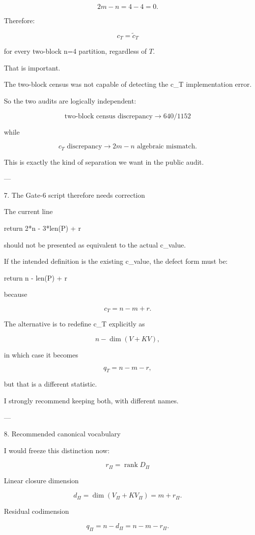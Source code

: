 \[
2m-n=4-4=0.
\]

Therefore:

\[
c_T=\widetilde c_T
\]

for every two-block n=4 partition, regardless of \(T\).

That is important.

The two-block census was not capable of detecting the c_T implementation error.

So the two audits are logically independent:

\[
\boxed{
\text{two-block census discrepancy}
\rightarrow
640/1152
}
\]

while

\[
\boxed{
c_T\text{ discrepancy}
\rightarrow
2m-n\text{ algebraic mismatch}.
}
\]

This is exactly the kind of separation we want in the public audit.


---

7. The Gate-6 script therefore needs correction

The current line

return 2*n - 3*len(P) + r

should not be presented as equivalent to the actual c_value.

If the intended definition is the existing c_value, the defect form must be:

return n - len(P) + r

because

\[
\boxed{
c_T=n-m+r.
}
\]

The alternative is to redefine c_T explicitly as

\[
n-\dim(V+KV),
\]

in which case it becomes

\[
\boxed{
q_T=n-m-r,
}
\]

but that is a different statistic.

I strongly recommend keeping both, with different names.


---

8. Recommended canonical vocabulary

I would freeze this distinction now:

\[
\boxed{
r_\Pi=\operatorname{rank}D_\Pi
}
\]

Linear closure dimension

\[
\boxed{
d_\Pi
=
\dim(V_\Pi+KV_\Pi)
=
m+r_\Pi.
}
\]

Residual codimension

\[
\boxed{
q_\Pi
=
n-d_\Pi
=
n-m-r_\Pi.
}
\]


